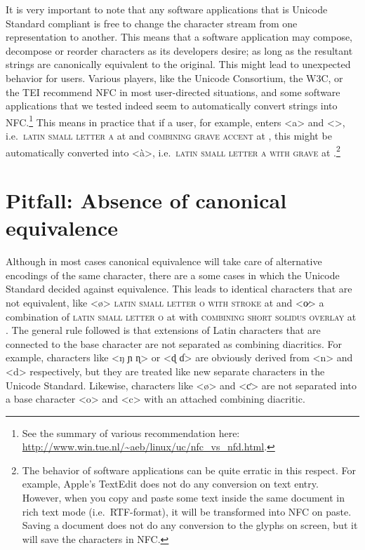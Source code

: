 It is very important to note that any software applications that is Unicode
Standard compliant is free to change the character stream from one
representation to another. This means that a software application may compose,
decompose or reorder characters as its developers desire; as long as the
resultant strings are canonically equivalent to the original. This might lead to
unexpected behavior for users. Various players, like the Unicode Consortium, the
W{\large 3}C, or the TEI recommend NFC in most user-directed situations, and
some software applications that we tested indeed seem to automatically convert
strings into NFC.\footnote{See the summary of various recommendation here:
\url{http://www.win.tue.nl/~aeb/linux/uc/nfc_vs_nfd.html}.} This means in
practice that if a user, for example, enters <a> and <>, i.e.~\textsc{latin
small letter a} at  and \textsc{combining grave accent} at ,
this might be automatically converted into <à>, i.e.~\textsc{latin small letter
a with grave} at .\footnote{The behavior of software applications can
be quite erratic in this respect. For example, Apple's TextEdit does not do any
conversion on text entry. However, when you copy and paste some text inside the
same document in rich text mode (i.e.~RTF-format), it will be transformed into
NFC on paste. Saving a document does not do any conversion to the glyphs on
screen, but it will save the characters in NFC.}


\section{Pitfall: Absence of canonical equivalence}
\label{pitfall-absence-of-equivalence}

Although in most cases canonical equivalence will take care of alternative
encodings of the same character, there are a some cases in which the Unicode
Standard decided against equivalence. This leads to identical characters that
are not equivalent, like <ø> \textsc{latin small letter o with stroke} at
 and <o̷> a combination of \textsc{latin small letter o} at 
with \textsc{combining short solidus overlay} at .
The general rule followed is that extensions of Latin characters that are
connected to the base character are not separated as combining diacritics. For
example, characters like <ŋ ɲ ɳ> or <ɖ ɗ> are obviously derived from <n> and <d>
respectively, but they are treated like new separate characters in the Unicode
Standard. Likewise, characters like <ø> and <ƈ> are not separated into a base 
character <o> and <c> with an attached combining diacritic.

